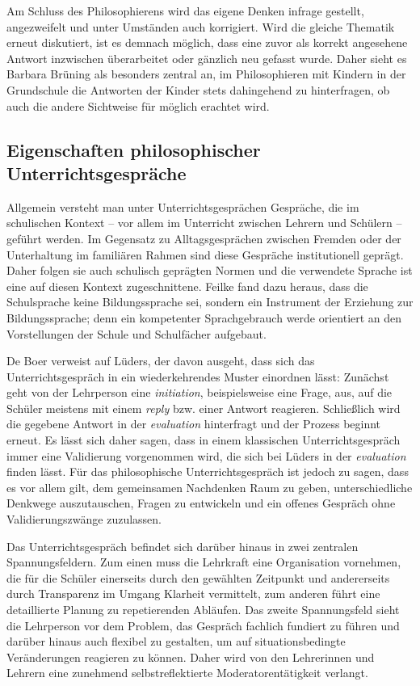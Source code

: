 Am Schluss des Philosophierens wird das eigene Denken infrage gestellt, angezweifelt und unter Umständen auch korrigiert. 
Wird die gleiche Thematik erneut diskutiert, ist es demnach möglich, dass eine zuvor als korrekt angesehene Antwort inzwischen überarbeitet oder gänzlich neu gefasst wurde. 
Daher sieht es Barbara Brüning als besonders zentral an, im Philosophieren mit Kindern in der Grundschule die Antworten der Kinder stets dahingehend zu hinterfragen, ob auch die andere Sichtweise für möglich erachtet wird.


\newpage
\subsection{Eigenschaften philosophischer Unterrichtsgespräche}

Allgemein versteht man unter Unterrichtsgesprächen Gespräche, die im schulischen Kontext -- vor allem im Unterricht zwischen Lehrern und Schülern -- geführt werden. 
Im Gegensatz zu Alltagsgesprächen zwischen Fremden oder der Unterhaltung im familiären Rahmen sind diese Gespräche \glqq institutionell geprägt\grqq{}\cite{HB15, S.28}. 
Daher folgen sie auch schulisch geprägten Normen und die verwendete Sprache ist eine auf diesen Kontext zugeschnittene. 
Feilke fand dazu heraus, dass \glqq die Schulsprache keine Bildungssprache sei, sondern ein Instrument der Erziehung zur Bildungssprache; denn ein kompetenter Sprachgebrauch werde orientiert an den Vorstellungen der Schule und Schulfächer aufgebaut.\grqq{}\cite{HF13, S.117}

De Boer verweist auf Lüders, der davon ausgeht, dass sich das Unterrichtsgespräch in ein wiederkehrendes Muster einordnen lässt\cite{HB15, S.28}:
 Zunächst geht von der Lehrperson eine \textit{initiation}, beispielsweise eine Frage, aus, auf die Schüler meistens mit einem \textit{reply} bzw. einer Antwort reagieren. 
 Schließlich wird die gegebene Antwort in der \textit{evaluation} hinterfragt und der Prozess beginnt erneut. 
 Es lässt sich daher sagen, dass in einem klassischen Unterrichtsgespräch immer eine Validierung vorgenommen wird, die sich bei Lüders in der \textit{evaluation} finden lässt. 
 Für das philosophische Unterrichtsgespräch ist jedoch zu sagen, dass es vor allem gilt, \glqq dem gemeinsamen Nachdenken Raum zu geben, unterschiedliche Denkwege auszutauschen, Fragen zu entwickeln und ein offenes Gespräch ohne Validierungszwänge zuzulassen\grqq{}\cite{HD15, S.159}.
 
Das Unterrichtsgespräch befindet sich darüber hinaus in zwei zentralen Spannungsfeldern. 
Zum einen muss die Lehrkraft eine Organisation vornehmen, die für die Schüler einerseits durch den gewählten Zeitpunkt und andererseits durch Transparenz im Umgang Klarheit vermittelt, zum anderen führt eine detaillierte Planung zu repetierenden Abläufen\cite{HB15, S.31}. 
Das zweite Spannungsfeld sieht die Lehrperson vor dem Problem, das Gespräch fachlich fundiert zu führen und darüber hinaus auch flexibel zu gestalten, um auf situationsbedingte Veränderungen reagieren zu können. 
Daher wird von den Lehrerinnen und Lehrern eine zunehmend selbstreflektierte Moderatorentätigkeit verlangt.

